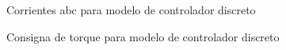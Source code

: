 \documentclass[a4paper, 10pt, onecolumn,journal]{ieeeconf}
\begin{document}
\begin{figure}[H]
	\centering
	\begin{adjustbox}{max width=\columnwidth}
	\end{adjustbox}
	\caption{Corrientes abc para modelo de controlador discreto}
	\label{Corrientes abc para modelo de controlador discreto}
\end{figure}
\begin{figure}[H]
	\centering
	\begin{adjustbox}{max width=\columnwidth}
	\end{adjustbox}
	\caption{Consigna de torque para modelo de controlador discreto}
	\label{Consigna de torque para modelo de controlador discreto}
\end{figure}
\end{document}
